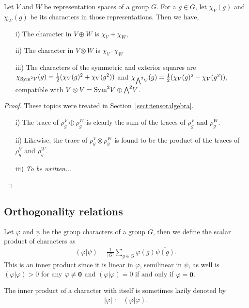 \begin{proposition}\label{prop:charplustimes}
	Let $V$ and $W$ be representation spaces of a group $G$. For a $g \in G$, let $\chi_V(g)$ and $\chi_W(g)$ be its characters in those representations. Then we have,
	\begin{enumerate}
		\item[i)] The character in $V \oplus W$ is $\chi_V+\chi_W$,
		\item[ii)] The character in $V \otimes W$ is $\chi_V \cdot \chi_W$
		\item[iii)] The characters of the symmetric and exterior squares are $\chi_{\text{Sym}^2 V}(g) = \frac{1}{2}(\chi_V(g)^2 + \chi_V(g^2))$ and $\chi_{{\bigwedge}^2 V}(g) = \frac{1}{2}(\chi_V(g)^2 - \chi_V(g^2))$, compatible with $V \otimes V = \text{Sym}^2 V \oplus {\bigwedge}^2 V$.
	\end{enumerate}
\end{proposition}
\begin{proof}
	These topics were treated in Section~\ref{sect:tensoralgebra}.
	\begin{enumerate}
		\item[i)] The trace of $\rho_g^V \oplus \rho_g^W$ is clearly the sum of the traces of $\rho_g^V$ and $\rho_g^W$.
		\item[ii)] Likewise, the trace of $\rho_g^V \otimes \rho_g^W$ is found to be the product of the traces of $\rho_g^V$ and $\rho_g^W$.
		\item[iii)] \textit{To be written...}
	\end{enumerate}
\end{proof}

\subsection{Orthogonality relations}

Let $\varphi$ and $\psi$ be the group characters of a group $G$, then we define the scalar product of characters as
\begin{align*}
	(\varphi | \psi) = \frac{1}{|G|} \sum_{g \in G} \varphi(g) \overline{\psi(g)}.
\end{align*}
This is an inner product since it is linear in $\varphi$, semilinear in $\psi$, as well is $(\varphi|\varphi) > 0 $ for any $\varphi \neq \mathbf{0}$ and $(\varphi|\varphi)=0$ if and only if $\varphi= \mathbf{0}$.

\begin{notation}
	The inner product of a character with itself is sometimes lazily denoted by \begin{align*}
		|\varphi| := (\varphi|\varphi).
	\end{align*}
\end{notation}

